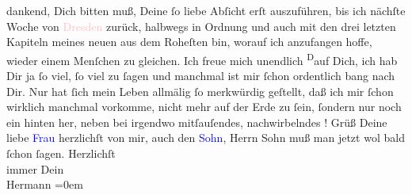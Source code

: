                dankend, Dich bitten muß, Deine ſo liebe Abſicht erſt auszuführen, bis ich nächſte
               Woche von \textcolor{pink}{Dresden}{}\ledrightnote{\textcolor{pink}{Dresden}} zurück, halbwegs in Ordnung und
               auch mit den drei letzten Kapiteln meines neuen \label{K_L01824_2v}\label{K_L01824_2h} aus dem Roheſten bin, worauf ich anzufangen hoffe, wieder einem
               Menſchen zu gleichen.\pend
           \pstart
           {\pb}Ich freue mich unendlich \substVorne{}\textsuperscript{D}\substDazwischen{}a\substHinten{}uf Dich, ich hab Dir ja ſo viel, ſo viel zu ſagen und manchmal ist mir ſchon
               ordentlich bang nach Dir. Nur hat ſich mein Leben allmälig ſo merkwürdig geſtellt,
               daß ich mir ſchon wirklich  manchmal vorkomme,
               nicht mehr auf der Erde zu ſein, ſondern nur noch ein hinten her, neben bei irgendwo
               mitſauſendes, nachwirbelndes \label{K_L01824_3v}\label{K_L01824_3h}!\pend
           \pstart
           Grüß Deine liebe \textcolor{blue}{Frau}{} herzlichſt
               von mir, auch den \textcolor{blue}{Sohn}{}, Herrn
               Sohn muß man jetzt wol bald ſchon ſagen.\pend
           \pstart
           Herzlichſt{\\[\baselineskip]}immer Dein{\\[\baselineskip]}\spacefill\mbox{Hermann}\pend
           \leftskip=0em{}\endnumbering{}  
      